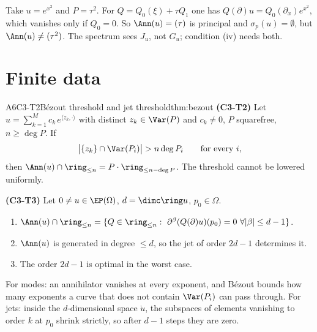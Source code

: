 \begin{caution}[title={An empty spectrum alone is not enough}]
Take $u=e^{x^2}$ and $P=\tau^2$. For $Q=Q_0(\xi)+\tau Q_1$ one has $Q(\partial)u=Q_0(\partial_x)e^{x^2}$, which vanishes only if $Q_0=0$. So $\Ann(u)=(\tau)$ is principal and $\sigma_p(u)=\emptyset$, but $\Ann(u)\ne(\tau^2)$. The spectrum sees $J_u$, not $G_u$; condition (iv) needs both.
\end{caution}

\section{Finite data}

\begin{dimcard}{A6}{C3-T2}{B\'ezout threshold and jet threshold}{\proved}{thm:bezout}
\textbf{(C3-T2)} Let $u=\sum_{k=1}^Mc_k\,e^{\langle z_k,\cdot\rangle}$ with distinct $z_k\in\Var(P)$ and $c_k\ne0$, $P$ squarefree, $n\ge\deg P$. If
\[
\big|\{z_k\}\cap\Var(P_i)\big|>n\deg P_i\qquad\text{for every }i,
\]
then $\Ann(u)\cap\ring_{\le n}=P\cdot\ring_{\le n-\deg P}$. The threshold cannot be lowered uniformly.

\label{dim:C3-T3}\textbf{(C3-T3)} Let $0\ne u\in\EP(\Omega)$, $d=\dimc\ring u$, $p_0\in\Omega$.
\begin{enumerate}[label=(\roman*)]
\item $\Ann(u)\cap\ring_{\le n}=\{Q\in\ring_{\le n}:\ \partial^\beta(Q(\partial)u)(p_0)=0\ \forall|\beta|\le d-1\}$.
\item $\Ann(u)$ is generated in degree $\le d$, so the jet of order $2d-1$ determines it.
\item The order $2d-1$ is optimal in the worst case.
\end{enumerate}
\end{dimcard}

\begin{proofidea}
For modes: an annihilator vanishes at every exponent, and B\'ezout bounds how many exponents a curve that does not contain $\Var(P_i)$ can pass through. For jets: inside the $d$-dimensional space $\ring u$, the subspaces of elements vanishing to order $k$ at $p_0$ shrink strictly, so after $d-1$ steps they are zero.
\end{proofidea}

